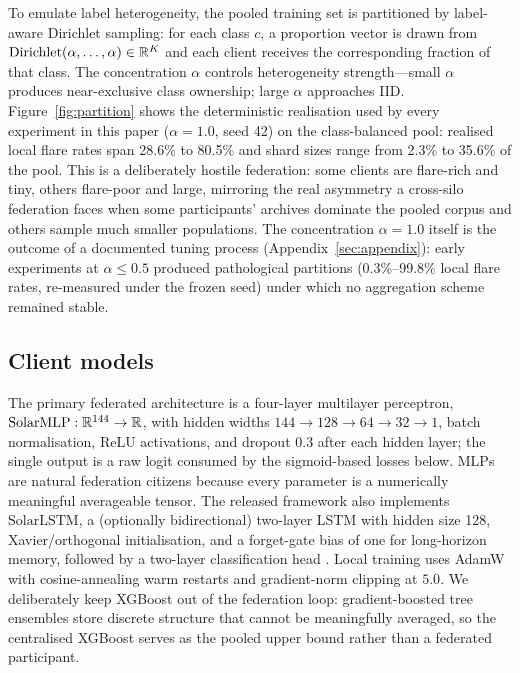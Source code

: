 To emulate label heterogeneity, the pooled training set is
partitioned by label-aware Dirichlet sampling: for each class $c$, a
proportion vector is drawn from
$\mathrm{Dirichlet}(\alpha,\dots,\alpha) \in \mathbb{R}^{K}$ and each client
receives the corresponding fraction of that class. The concentration
$\alpha$ controls heterogeneity strength---small $\alpha$ produces
near-exclusive class ownership; large $\alpha$ approaches IID.
Figure~\ref{fig:partition} shows the deterministic realisation
used by every experiment in this paper ($\alpha=1.0$, seed 42) on the
class-balanced pool: realised local flare rates span 28.6\% to
80.5\% and shard sizes range from 2.3\% to 35.6\% of the pool. This
is a deliberately hostile federation: some clients are flare-rich and
tiny, others flare-poor and large, mirroring the real asymmetry a
cross-silo federation faces when some participants' archives dominate
the pooled corpus and others sample much smaller populations. The
concentration $\alpha=1.0$
itself is the outcome of a documented tuning process
(Appendix~\ref{sec:appendix}): early experiments at $\alpha \le 0.5$
produced pathological partitions (0.3\%--99.8\% local flare rates,
re-measured under the frozen seed) under
which no aggregation scheme remained stable.

\subsection{Client models}

The primary federated architecture is a four-layer multilayer
perceptron, $\mathrm{SolarMLP}: \mathbb{R}^{144} \to \mathbb{R}$, with hidden widths
$144 \to 128 \to 64 \to 32 \to 1$, batch normalisation, ReLU
activations, and dropout $0.3$ after each hidden layer; the single
output is a raw logit consumed by the sigmoid-based losses below. MLPs
are natural federation citizens because every parameter is a
numerically meaningful averageable tensor. The released framework also
implements $\mathrm{SolarLSTM}$, a (optionally bidirectional) two-layer
LSTM with hidden size 128, Xavier/orthogonal initialisation, and a
forget-gate bias of one for long-horizon memory, followed by a
two-layer classification head \cite{hochreiter1997,hassani2025}. Local
training uses AdamW \cite{loshchilov2019} with cosine-annealing warm
restarts and gradient-norm clipping at $5.0$. We deliberately keep
XGBoost out of the federation loop: gradient-boosted tree ensembles
store discrete structure that cannot be meaningfully averaged, so the
centralised XGBoost serves as the pooled upper bound rather than a
federated participant.

